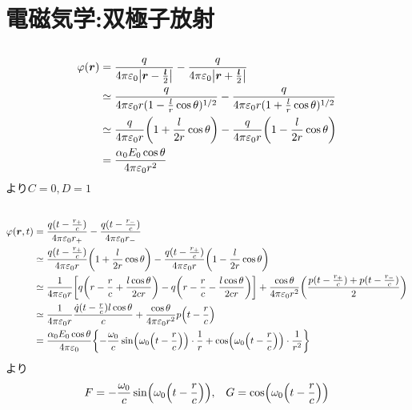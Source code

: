\documentclass[../ap_2021.tex]{subfiles}
\begin{document}
\setcounter{chapter}{3}
\chapter{電磁気学:双極子放射}
\section{}
\begin{equation}\begin{aligned}[b]
    \varphi(\vb*{r})&=\frac{q}{4\pi\varepsilon_0\abs{\vb*{r}-\frac{\vb*{l}}{2}}}-\frac{q}{4\pi\varepsilon_0\abs{\vb*{r}+\frac{\vb*{l}}{2}}}\\
    &\simeq \frac{q}{4\pi\varepsilon_0r(1-\frac{l}{r}\cos\theta)^{1/2}}-\frac{q}{4\pi\varepsilon_0r(1+\frac{l}{r}\cos\theta)^{1/2}}\\
    &\simeq \frac{q}{4\pi\varepsilon_0r}\qty(1+\frac{l}{2r}\cos\theta)-\frac{q}{4\pi\varepsilon_0r}\qty(1-\frac{l}{2r}\cos\theta)\\
    &= \frac{\alpha_0E_0\cos\theta}{4\pi\varepsilon_0r^2}
\end{aligned}\end{equation}
より\(C=0,D=1\)

\section{}
\begin{equation}\begin{aligned}[b]
    \varphi(\vb*{r},t)
    &=\frac{q(t-\frac{r_+}{c})}{4\pi\varepsilon_0r_+}-\frac{q(t-\frac{r_-}{c})}{4\pi\varepsilon_0r_-}\\
    &\simeq \frac{q(t-\frac{r_+}{c})}{4\pi\varepsilon_0r}\qty(1+\frac{l}{2r}\cos\theta)-\frac{q(t-\frac{r_+}{c})}{4\pi\varepsilon_0r}\qty(1-\frac{l}{2r}\cos\theta)\\
    &\simeq \frac{1}{4\pi\varepsilon_0 r}\qty[q\qty(r-\frac{r}{c}+\frac{l\cos\theta}{2cr})-q\qty(r-\frac{r}{c}-\frac{l\cos\theta}{2cr})]
        +\frac{\cos\theta}{4\pi\varepsilon_0r^2}\qty(\frac{p(t-\frac{r_+}{c})+p(t-\frac{r_-}{c})}{2})\\
    &\simeq\frac{1}{4\pi\varepsilon_0r}\frac{\dot{q}(t-\frac{r}{c})l\cos\theta}{c}+\frac{\cos\theta}{4\pi\varepsilon_0r^2}p\qty(t-\frac{r}{c})\\
    &=\frac{\alpha_0E_0\cos\theta}{4\pi\varepsilon_0}\qty{-\frac{\omega_0}{c}\sin(\omega_0\qty(t-\frac{r}{c}))\cdot\frac{1}{r}
    +\cos(\omega_0\qty(t-\frac{r}{c}))\cdot\frac{1}{r^2}}
\end{aligned}\end{equation}
より
\begin{equation}\begin{aligned}[b]
    F &= -\frac{\omega_0}{c}\sin(\omega_0\qty(t-\frac{r}{c})), & G = \cos(\omega_0\qty(t-\frac{r}{c}))
\end{aligned}\end{equation}
\end{document}
